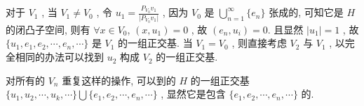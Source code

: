 \documentclass[UTF8]{ctexart}
\begin{document}
        对于 $V_1$ , 当 $V_1\neq V_0$ , 令 $u_1=\frac{P_{V_0}v_1}{\vert P_{V_0}v_1\vert}$ ,
        因为 $V_0$ 是 $\bigcup^\infty_{n=1}\{e_n\}$ 张成的, 可知它是 $H$ 的闭凸子空间, 
        则有 $\forall x\in V_0$, $(x, u_1)=0$ , 故 $ (e_n,u_i)=0$.
        且显然 $\vert u_1\vert=1$ , 
        故 $\{u_1, e_1, e_2, \cdots, e_n, \cdots \}$ 是 $V_1$ 的一组正交基.
        当 $V_1 = V_0$ , 则直接考虑 $V_2$ 与 $V_1$ , 以完全相同的办法可以找到 $u_2$ 构成 $V_2$ 的一组正交基.

        对所有的 $V_n$ 重复这样的操作, 可以到的 $H$ 的一组正交基 $\{u_1, u_2, \cdots, u_k, \cdots \}\bigcup\{e_1, e_2, \cdots, e_n, \cdots \}$ , 显然它是包含 $\{e_1, e_2, \cdots, e_n, \cdots \}$ 的.
\end{document}
